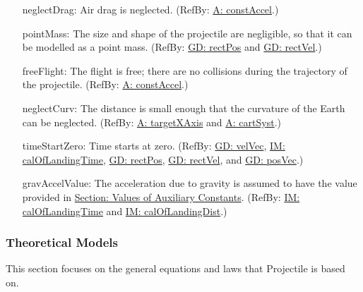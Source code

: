 \documentclass[12pt]{article}
\begin{document}
\begin{itemize}
\item[neglectDrag:\phantomsection\label{neglectDrag}]{Air drag is neglected. (RefBy: \hyperref[constAccel]{A: constAccel}.)}
\item[pointMass:\phantomsection\label{pointMass}]{The size and shape of the projectile are negligible, so that it can be modelled as a point mass. (RefBy: \hyperref[GD:rectPos]{GD: rectPos} and \hyperref[GD:rectVel]{GD: rectVel}.)}
\item[freeFlight:\phantomsection\label{freeFlight}]{The flight is free; there are no collisions during the trajectory of the projectile. (RefBy: \hyperref[constAccel]{A: constAccel}.)}
\item[neglectCurv:\phantomsection\label{neglectCurv}]{The distance is small enough that the curvature of the Earth can be neglected. (RefBy: \hyperref[targetXAxis]{A: targetXAxis} and \hyperref[cartSyst]{A: cartSyst}.)}
\item[timeStartZero:\phantomsection\label{timeStartZero}]{Time starts at zero. (RefBy: \hyperref[GD:velVec]{GD: velVec}, \hyperref[IM:calOfLandingTime]{IM: calOfLandingTime}, \hyperref[GD:rectPos]{GD: rectPos}, \hyperref[GD:rectVel]{GD: rectVel}, and \hyperref[GD:posVec]{GD: posVec}.)}
\item[gravAccelValue:\phantomsection\label{gravAccelValue}]{The acceleration due to gravity is assumed to have the value provided in \hyperref[Sec:AuxConstants]{Section: Values of Auxiliary Constants}. (RefBy: \hyperref[IM:calOfLandingTime]{IM: calOfLandingTime} and \hyperref[IM:calOfLandingDist]{IM: calOfLandingDist}.)}
\end{itemize}
\subsubsection{Theoretical Models}
\label{Sec:TMs}
This section focuses on the general equations and laws that Projectile is based on.
\end{document}
